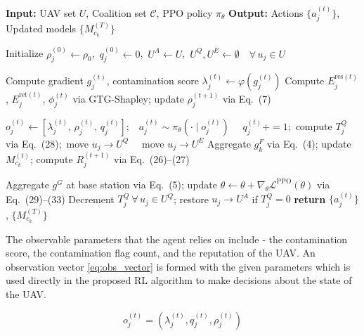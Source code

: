 \documentclass[10pt,journal,compsoc]{IEEEtran}
\begin{document}
\begin{algorithm}[t]
\caption{PPO-Based UAV State Management}
\label{alg:ppo_uav}
\begin{algorithmic}[1]
\Statex \textbf{Input:} UAV set $U$, Coalition set $\mathcal{C}$, PPO policy $\pi_\theta$
\Statex \textbf{Output:} Actions $\{a_j^{(t)}\}$, Updated models $\{M_{c_k}^{(T)}\}$

\State Initialize $\rho_j^{(0)} \leftarrow \rho_0$,\ $q_j^{(0)} \leftarrow 0$,\ $U^A \leftarrow U$,\ $U^Q, U^E \leftarrow \emptyset \quad \forall\, u_j \in U$

     
        \State Compute gradient $g_j^{(t)}$, contamination score $\lambda_j^{(t)} \leftarrow \varphi(g_j^{(t)})$
        \State Compute $E_j^{\mathrm{res}(t)}$, $E_j^{\mathrm{ret}(t)}$, $\phi_j^{(t)}$ via GTG-Shapley; update $\rho_j^{(t+1)}$ via Eq.~(7)
    \EndFor

     
            \State $o_j^{(t)} \leftarrow [\lambda_j^{(t)},\, \rho_j^{(t)},\, q_j^{(t)}]$;\ \ $a_j^{(t)} \sim \pi_\theta(\cdot \mid o_j^{(t)})$
            \ \ $q_j^{(t)}{\mathrel{+}=}1$;\ compute $T_j^Q$ via Eq.~(28);\ move $u_j \to U^Q$
            \ \ move $u_j \to U^E$
            \EndIf
        \EndFor
        \State Aggregate $g_k^F$ via Eq.~(4); update $M_{c_k}^{(t)}$; compute $R_j^{(t+1)}$ via Eq.~(26)--(27)
    \EndFor

    \State Aggregate $g^G$ at base station via Eq.~(5); update $\theta \leftarrow \theta + \nabla_\theta \mathcal{L}^{\mathrm{PPO}}(\theta)$ via Eq.~(29)--(33)
    \State Decrement $T_j^Q\ \forall\, u_j \in U^Q$; restore $u_j \to U^A$ if $T_j^Q = 0$
\EndFor
\State \textbf{return} $\{a_j^{(t)}\}$, $\{M_{c_k}^{(T)}\}$
\end{algorithmic}
\end{algorithm}

The observable parameters that the agent relies on include - the contamination score, the contamination flag count, and the reputation of the UAV. An observation vector \eqref{eq:obs_vector} is formed with the given parameters which is used directly in the proposed RL algorithm to make decisions about the state of the UAV.

\begin{equation}\label{eq:obs_vector}
o_j^{(t)}
=
(\lambda_j^{(t)}, q_j^{(t)}, \rho_j^{(t)})
\end{equation}
\end{document}
